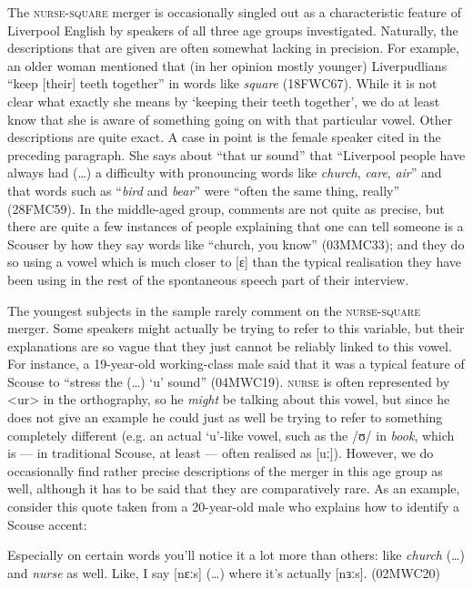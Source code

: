 The \textsc{nurse}-\textsc{square} merger is occasionally singled out as a characteristic feature of Liverpool English by speakers of all three age groups investigated.
Naturally, the descriptions that are given are often somewhat lacking in precision.
For example, an older woman mentioned that (in her opinion mostly younger) Liverpudlians ``keep [their] teeth together'' in words like \emph{square} (18FWC67).
While it is not clear what exactly she means by `keeping their teeth together', we do at least know that she is aware of something going on with that particular vowel.
Other descriptions are quite exact.
A case in point is the female speaker cited in the preceding paragraph.
She says about ``that ur sound'' that  ``Liverpool people have always had (\ldots) a difficulty with pronouncing words like \emph{church}, \emph{care}, \emph{air}'' and that words such as ``\emph{bird} and \emph{bear}'' were ``often the same thing, really'' (28FMC59).
In the middle-aged group, comments are not quite as precise, but there are quite a few instances of people explaining that one can tell someone is a Scouser by how they say words like ``church, you know'' (03MMC33); and they do so using a vowel which is much closer to [ɛ] than the typical realisation they have been using in the rest of the spontaneous speech part of their interview.

The youngest subjects in the sample rarely comment on the \textsc{nurse}-\textsc{square} merger.
Some speakers might actually be trying to refer to this variable, but their explanations are so vague that they just cannot be reliably linked to this vowel.
For instance, a 19-year-old working-class male said that it was a typical feature of Scouse to ``stress the (\ldots) `u' sound'' (04MWC19).
\textsc{nurse} is often represented by <ur> in the orthography, so he \emph{might} be talking about this vowel, but since he does not give an example he could just as well be trying to refer to something completely different (e.g. an actual `u'-like vowel, such as the /ʊ/ in \emph{book}, which is --- in traditional Scouse, at least --- often realised as [uː]).
However, we do occasionally find rather precise descriptions of the merger in this age group as well, although it has to be said that they are comparatively rare.
As an example, consider this quote taken from a 20-year-old male who explains how to identify a Scouse accent:
\begin{example}
	Especially on certain words you'll notice it a lot more than others: like \emph{church} (\ldots) and \emph{nurse} as well.
	Like, I say [nɛːs] (\ldots) where it's actually [nɜːs]. (02MWC20)
\end{example}

